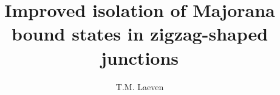\documentclass{tudelft-report}
\begin{document}
\frontmatter

\title[tudelft-white]{Improved isolation of Majorana bound states in zigzag-shaped junctions}
\subtitle[tudelft-black]{
}
\author[tudelft-white]{T.M. Laeven}

\makecover[split]






\tableofcontents

\mainmatter






\appendix

%


\end{document}
